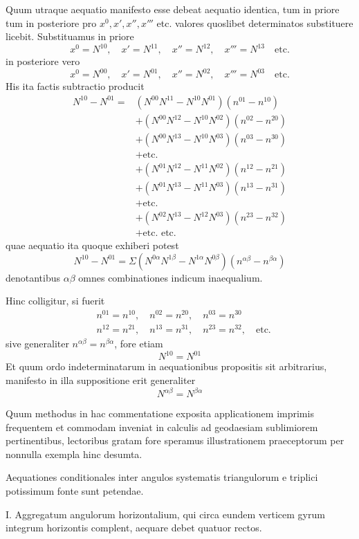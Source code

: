 Quum utraque aequatio manifesto esse debeat aequatio identica, tum in priore tum in posteriore pro \(x^0,x',x'',x'''\) etc. valores quoslibet determinatos substituere licebit. Substituamus in priore
\[
x^0=N^{10},\quad x'=N^{11},\quad x''=N^{12},\quad x'''=N^{13}\quad\text{etc.}
\]
in posteriore vero
\[
x^0=N^{00},\quad x'=N^{01},\quad x''=N^{02},\quad x'''=N^{03}\quad\text{etc.}
\]
His ita factis subtractio producit
\[
\begin{aligned}
N^{10}-N^{01}={}&(N^{00}N^{11}-N^{10}N^{01})(n^{01}-n^{10})\\
&+(N^{00}N^{12}-N^{10}N^{02})(n^{02}-n^{20})\\
&+(N^{00}N^{13}-N^{10}N^{03})(n^{03}-n^{30})\\
&+\text{etc.}\\
&+(N^{01}N^{12}-N^{11}N^{02})(n^{12}-n^{21})\\
&+(N^{01}N^{13}-N^{11}N^{03})(n^{13}-n^{31})\\
&+\text{etc.}\\
&+(N^{02}N^{13}-N^{12}N^{03})(n^{23}-n^{32})\\
&+\text{etc. etc.}
\end{aligned}
\]
quae aequatio ita quoque exhiberi potest
\[
N^{10}-N^{01}=\Sigma(N^{0\alpha}N^{1\beta}-N^{1\alpha}N^{0\beta})(n^{\alpha\beta}-n^{\beta\alpha})
\]
denotantibus \(\alpha\beta\) omnes combinationes indicum inaequalium.

Hinc colligitur, si fuerit
\[
\begin{aligned}
&n^{01}=n^{10},\quad n^{02}=n^{20},\quad n^{03}=n^{30}\\
&n^{12}=n^{21},\quad n^{13}=n^{31},\quad n^{23}=n^{32},\quad\text{etc.}
\end{aligned}
\]
sive generaliter \(n^{\alpha\beta}=n^{\beta\alpha}\), fore etiam
\[
N^{10}=N^{01}
\]
Et quum ordo indeterminatarum in aequationibus propositis sit arbitrarius, manifesto in illa suppositione erit generaliter
\[
N^{\alpha\beta}=N^{\beta\alpha}
\]

Quum methodus in hac commentatione exposita applicationem imprimis frequentem et commodam inveniat in calculis ad geodaesiam sublimiorem pertinentibus, lectoribus gratam fore speramus illustrationem praeceptorum per nonnulla exempla hinc desumta.

Aequationes conditionales inter angulos systematis triangulorum e triplici potissimum fonte sunt petendae.

I. Aggregatum angulorum horizontalium, qui circa eundem verticem gyrum integrum horizontis complent, aequare debet quatuor rectos.

